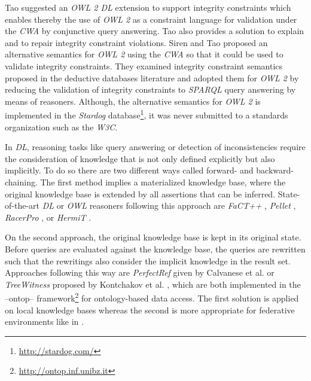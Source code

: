 \documentclass{acm_proc_article-sp}
\begin{document}
Tao \cite{tao2012integrity} suggested an \emph{OWL 2 DL} extension to support integrity constraints 
which enables thereby the use of \emph{OWL 2} as a constraint language for validation under the \emph{CWA} by conjunctive query answering. 
Tao also provides a solution to explain and to repair integrity constraint violations.
Siren and Tao \cite{SirinTao2009} proposed an alternative semantics for \emph{OWL 2} using the \emph{CWA} 
so that it could be used to validate integrity constraints.
They examined integrity constraint semantics proposed in the deductive databases literature and adopted them for \emph{OWL 2}
by reducing the validation of integrity constraints to \emph{SPARQL} query answering by means of reasoners.
Although, the alternative semantics for \emph{OWL 2} is implemented in the \emph{Stardog} database\footnote{\url{http://stardog.com/}}, it was never submitted to a standards organization such as the \emph{W3C}.

In \emph{DL}, reasoning tasks like query answering or detection of inconsistencies require the consideration of knowledge that is not only defined explicitly but also implicitly. To do so there are two different ways called forward- and backward-chaining. 
The first method implies a materialized knowledge base, where the original knowledge base is extended by all assertions that can be inferred. State-of-the-art \emph{DL} or \emph{OWL} reasoners following this approach are \emph{FaCT++} \cite{tsarkov2006fact++}, \emph{Pellet} \cite{sirin2007pellet},  \emph{RacerPro} \cite{haarslev2001racer}, or \emph{HermiT} \cite{horrocks2012hermit}. 

On the second approach, the original knowledge base is kept in its original state.
Before queries are evaluated against the knowledge base, the queries are rewritten such that the rewritings also consider the implicit knowledge in the result set. 
Approaches following this way are \emph{PerfectRef} given by Calvanese et al. \cite{Calvanese2007} or \emph{TreeWitness} proposed by Kontchakov et al. \cite{kontchakov2011combined}, which are both implemented in the --ontop-- framework\footnote{\url{http://ontop.inf.unibz.it}} for ontology-based data access. 
The first solution is applied on local knowledge bases whereas the second is more appropriate for federative environments like in \cite{nolle2014efficient,nolle2013elite}. 
\end{document}
